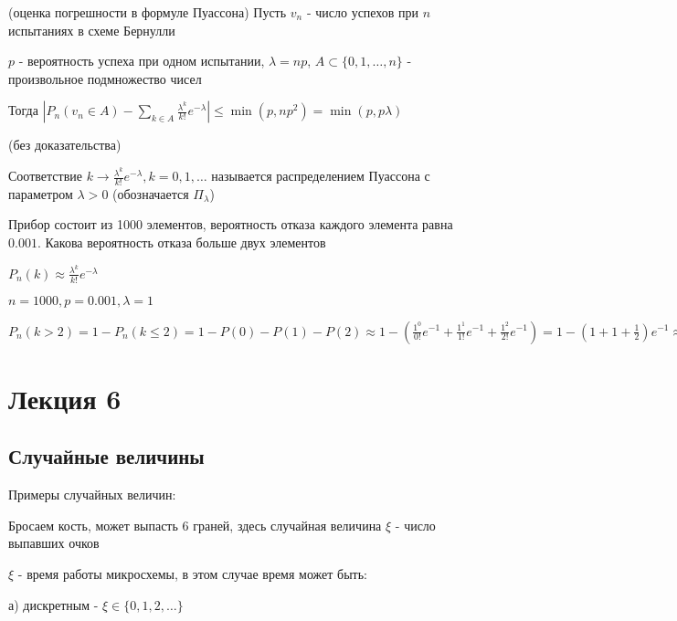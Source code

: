 \documentclass[12pt]{article}
\begin{document}
    \hypertarget{errorinpoissonformula}{}

    \begin{MyTheorem}
         (оценка погрешности в формуле Пуассона) Пусть $v_n$ - число успехов при $n$ испытаниях в схеме Бернулли

        $p$ - вероятность успеха при одном испытании, $\lambda = np$, $A \subset \{0, 1, \dots, n\}$ - произвольное подмножество чисел

        Тогда $|P_n (v_n \in A) - \sum_{k \in A} \frac{\lambda^k}{k!} e^{-\lambda}| \leq \min (p, np^2) = \min (p, p\lambda)$

        (без доказательства)
    \end{MyTheorem}

    \Def Соответствие $k \to \frac{\lambda^k}{k!} e^{-\lambda}, k = 0, 1, \dots$ называется распределением Пуассона
    с параметром $\lambda > 0$ (обозначается $\Pi_\lambda$)

    \Ex Прибор состоит из 1000 элементов, вероятность отказа каждого элемента равна $0.001$. Какова вероятность отказа больше двух элементов

    $P_n(k) \approx \frac{\lambda^k}{k!} e^{-\lambda}$

    $n = 1000, p = 0.001, \lambda = 1$

    $P_n(k > 2) = 1 - P_n (k \leq 2) = 1 - P(0) - P(1) - P(2) \approx 1 - \left(\frac{1^0}{0!} e^{-1} + \frac{1^1}{1!} e^{-1} + \frac{1^2}{2!} e^{-1}\right) =
    1 - \left(1 + 1 + \frac{1}{2}\right) e^{-1} \approx 0.0803$


    \section{Лекция 6}

    \subsection{Случайные величины}

    Примеры случайных величин:

     Бросаем кость, может выпасть 6 граней, здесь случайная величина $\xi$ - число выпавших очков

     $\xi$ - время работы микросхемы, в этом случае время может быть:

    а) дискретным - $\xi \in \{0, 1, 2, \dots\}$
\end{document}
